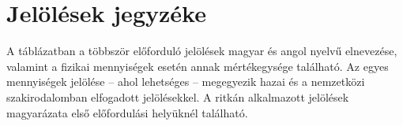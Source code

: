 \documentclass[12pt,a4paper]{article}
\begin{document}
\newpage
\thispagestyle{empty}
\tableofcontents
\newpage


\newpage
\thispagestyle{plain}

\newpage

\thispagestyle{plain}
\section*{Jelölések jegyzéke}

A táblázatban a többször előforduló jelölések magyar és angol nyelvű elnevezése, valamint a fizikai mennyiségek esetén annak mértékegysége található. Az egyes mennyiségek jelölése – ahol lehetséges – megegyezik hazai és a nemzetközi szakirodalomban elfogadott jelölésekkel. A ritkán alkalmazott jelölések magyarázata első előfordulási helyüknél található.
\end{document}
